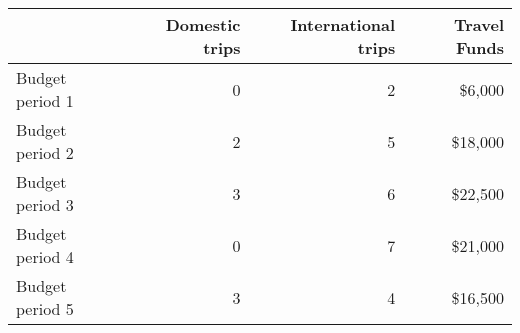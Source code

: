 \begin{tabular}{lrrr}
\hline
{} &  Domestic trips &  International trips & Travel Funds \\
\hline
Budget period 1 &               0 &                    2 &       \$6,000 \\
Budget period 2 &               2 &                    5 &      \$18,000 \\
Budget period 3 &               3 &                    6 &      \$22,500 \\
Budget period 4 &               0 &                    7 &      \$21,000 \\
Budget period 5 &               3 &                    4 &      \$16,500 \\
\hline
\end{tabular}
